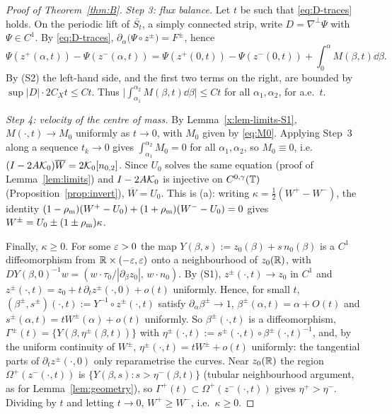 \begin{proof}[Proof of Theorem~\ref{thm:B}]
\emph{Step 3: flux balance.} Let $t$ be such that \eqref{eq:D-traces} holds. On the periodic lift of $\overline{S_t}$, a simply connected strip, write $D=\nabla^\perp\Psi$ with $\Psi\in C^1$. By
\eqref{eq:D-traces}, $\partial_\alpha\big(\Psi\circ z^\pm\big)=F^\pm$, hence
\[
\Psi(z^+(\alpha,t))-\Psi(z^-(\alpha,t))=\Psi(z^+(0,t))-\Psi(z^-(0,t))+\int_0^\alpha M(\beta,t)\dd\beta .
\]
By (S2) the left-hand side, and the first two terms on the right, are bounded by $\sup|D|\cdot2C_Xt\le Ct$. Thus $\big|\int_{\alpha_1}^{\alpha_2}M(\beta,t)\dd\beta\big|\le Ct$ for all $\alpha_1,\alpha_2$,
for a.e.\ $t$.

\emph{Step 4: velocity of the centre of mass.} By Lemma~\ref{x:lem-limits-S1}, $M(\cdot,t)\to M_0$ uniformly as $t\to0$, with $M_0$ given by \eqref{eq:M0}. Applying Step~3 along a sequence
$t_k\to0$ gives $\int_{\alpha_1}^{\alpha_2}M_0=0$ for all $\alpha_1,\alpha_2$, so $M_0\equiv0$, i.e.\ $(I-2A\mathcal{K}_0)\overline W=2\mathcal{K}_0[n_{0,2}]$. Since $U_0$ solves the same equation (proof of
Lemma~\ref{lem:limits}) and $I-2A\mathcal{K}_0$ is injective on $C^{0,\gamma}(\mathbb{T})$ (Proposition~\ref{prop:invert}), $\overline W=U_0$. This is (a): writing $\kappa=\frac12(W^+-W^-)$, the identity
$(1-\rho_{\mathrm m})(W^+-U_0)+(1+\rho_{\mathrm m})(W^--U_0)=0$ gives $W^\pm=U_0\pm(1\pm\rho_{\mathrm m})\kappa$.

Finally, $\kappa\ge0$. For some $\varepsilon>0$ the map $Y(\beta,s):=z_0(\beta)+s\,n_0(\beta)$ is a $C^1$ diffeomorphism from $\mathbb{R}\times(-\varepsilon,\varepsilon)$ onto a neighbourhood of $z_0(\mathbb{R})$, with
$DY(\beta,0)^{-1}w=(w\cdot\tau_0/|\partial_\beta z_0|,\,w\cdot n_0)$. By (S1), $z^\pm(\cdot,t)\to z_0$ in $C^1$ and $z^\pm(\cdot,t)=z_0+t\,\partial_tz^\pm(\cdot,0)+o(t)$ uniformly. Hence, for small $t$,
$(\beta^\pm,s^\pm)(\cdot,t):=Y^{-1}\circ z^\pm(\cdot,t)$ satisfy $\partial_\alpha\beta^\pm\to1$, $\beta^\pm(\alpha,t)=\alpha+O(t)$ and $s^\pm(\alpha,t)=tW^\pm(\alpha)+o(t)$ uniformly. So
$\beta^\pm(\cdot,t)$ is a diffeomorphism, $\Gamma^\pm(t)=\{Y(\beta,\eta^\pm(\beta,t))\}$ with $\eta^\pm(\cdot,t):=s^\pm(\cdot,t)\circ\beta^\pm(\cdot,t)^{-1}$, and, by the uniform continuity of
$W^\pm$, $\eta^\pm(\cdot,t)=tW^\pm+o(t)$ uniformly: the tangential parts of $\partial_tz^\pm(\cdot,0)$ only reparametrise the curves. Near $z_0(\mathbb{R})$ the region $\Omega^+(z^-(\cdot,t))$ is
$\{Y(\beta,s):s>\eta^-(\beta,t)\}$ (tubular neighbourhood argument, as for Lemma~\ref{lem:geometry}), so $\Gamma^+(t)\subset\Omega^+(z^-(\cdot,t))$ gives $\eta^+>\eta^-$. Dividing by $t$
and letting $t\to0$, $W^+\ge W^-$, i.e.\ $\kappa\ge0$.


\end{proof}
